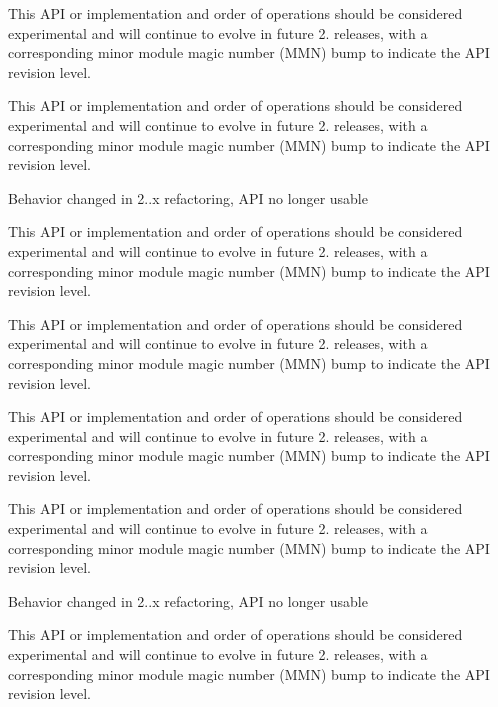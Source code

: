 \begin{DoxyRefList}
This A\+PI or implementation and order of operations should be considered experimental and will continue to evolve in future 2. releases, with a corresponding minor module magic number (M\+MN) bump to indicate the A\+PI revision level. 

This A\+PI or implementation and order of operations should be considered experimental and will continue to evolve in future 2. releases, with a corresponding minor module magic number (M\+MN) bump to indicate the A\+PI revision level. 

Behavior changed in 2..\+x refactoring, A\+PI no longer usable  
\item[\label{bug__bug000003}%
\hypertarget{bug__bug000003}{}%
Global \hyperlink{group__APACHE__CORE__MUTEX_ga354bb6f9a53786fa1259e061ced592e2}{A\+P\+\_\+\+D\+E\+C\+L\+A\+RE} (apr\+\_\+status\+\_\+t) ap\+\_\+parse\+\_\+mutex(const char $\ast$arg]This A\+PI or implementation and order of operations should be considered experimental and will continue to evolve in future 2. releases, with a corresponding minor module magic number (M\+MN) bump to indicate the A\+PI revision level. 

This A\+PI or implementation and order of operations should be considered experimental and will continue to evolve in future 2. releases, with a corresponding minor module magic number (M\+MN) bump to indicate the A\+PI revision level. 

This A\+PI or implementation and order of operations should be considered experimental and will continue to evolve in future 2. releases, with a corresponding minor module magic number (M\+MN) bump to indicate the A\+PI revision level. 

This A\+PI or implementation and order of operations should be considered experimental and will continue to evolve in future 2. releases, with a corresponding minor module magic number (M\+MN) bump to indicate the A\+PI revision level. 

Behavior changed in 2..\+x refactoring, A\+PI no longer usable  
\item[\label{bug__bug000001}%
\hypertarget{bug__bug000001}{}%
Global \hyperlink{group__APACHE__CORE__PROTO_ga6750389239653e3c73ff261c96777ff0}{A\+P\+\_\+\+D\+E\+C\+L\+A\+R\+E\+\_\+\+H\+O\+OK} (int, protocol\+\_\+propose,(\hyperlink{structconn__rec}{conn\+\_\+rec} $\ast$c, \hyperlink{structrequest__rec}{request\+\_\+rec} $\ast$r, \hyperlink{structserver__rec}{server\+\_\+rec} $\ast$s, const \hyperlink{structapr__array__header__t}{apr\+\_\+array\+\_\+header\+\_\+t} $\ast$offers, \hyperlink{structapr__array__header__t}{apr\+\_\+array\+\_\+header\+\_\+t} $\ast$proposals)) A\+P\+\_\+\+D\+E\+C\+L\+A\+R\+E\+\_\+\+H\+O\+OK(int]This A\+PI or implementation and order of operations should be considered experimental and will continue to evolve in future 2. releases, with a corresponding minor module magic number (M\+MN) bump to indicate the A\+PI revision level. 


\end{DoxyRefList}
